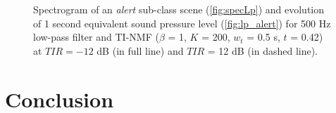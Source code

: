 \documentclass[twocolumn]{svjour3}          %
\begin{document}
\begin{figure}[t]
  \centering
  \caption{Spectrogram of an \textit{alert} sub-class scene (\ref{fig:specLp}) and evolution of 1 second equivalent sound pressure level (\ref{fig:lp_alert}) for 500 Hz low-pass filter and TI-NMF ($\beta$ = 1, $K$ = 200, $w_t$ = 0.5 s, $t$ = 0.42) at $TIR = -12$ dB (in full line) and $TIR$ = 12 dB (in dashed line).}
  \label{fig:spec_alert}
\end{figure}

\section{Conclusion}
\end{document}
